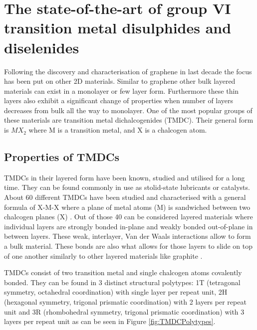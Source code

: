 \chapter{The state-of-the-art of group VI transition metal disulphides and diselenides}
\label{sec:Introduction}

Following the discovery and characterisation of graphene in last decade the focus has been put on other 2D materials. Similar to graphene other bulk layered materials can exist in a monolayer or few layer form. Furthermore these thin layers also exhibit a significant change of properties when number of layers decreases from bulk all the way to monolayer. One of the most popular groups of these materials are transition metal dichalcogenides (TMDC). Their general form is $MX_2$ where M is a transition metal, and X is a chalcogen atom.  

\section{Properties of TMDCs}

TMDCs in their layered form have been known, studied and utilised for a long time. They can be found commonly in use as stolid-state lubricants or catalysts. About 60 different TMDCs have been studied and characterised with a general formula of X-M-X where a plane of metal atoms (M) is sandwiched between two chalcogen planes (X) \cite{TheTransitionMetalDichalcogenidesDiscussionAndInterpretationOfTheObservedOpticalElectricalAndStructuralProperties}. Out of those 40 can be considered layered materials where individual layers are strongly bonded in-plane and weakly bonded out-of-plane in between layers. These weak, interlayer, Van der Waals interactions allow to form a bulk material. These bonds are also what allows for those layers to slide on top of one another similarly to other layered materials like graphite \cite{Chhowalla2013}. 

TMDCs consist of two transition metal and single chalcogen atoms covalently bonded. They can be found in 3 distinct structural polytypes: 1T (tetragonal symmetry, octahedral coordination) with single layer per repeat unit, 2H (hexagonal symmetry, trigonal prismatic coordination) with 2 layers per repeat unit and 3R (rhombohedral symmetry, trigonal prismatic coordination) with 3 layers per repeat unit \cite{ElectronicsAndOptoelectronicsOfTwo-dimensionalTransitionMetalDichalcogenides}\cite{Chhowalla2013}\cite{Lieth1977} as can be seen in Figure \ref{fig:TMDCPolytypes}.
	
